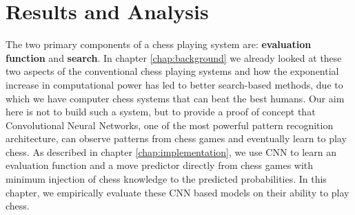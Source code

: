\chapter{Results and Analysis}
\label{chap:results}
The two primary components of a chess playing system are: \textbf{evaluation 
function} and \textbf{search}. In chapter \ref{chap:background} we already 
looked at these two aspects of the conventional chess playing systems and how 
the exponential increase in computational power has led to better search-based 
methods, due to which we have computer chess systems that can beat the best 
humans. Our aim here is not to build such a system, but to provide a proof of 
concept that Convolutional Neural Networks, one of the most powerful pattern 
recognition architecture, can observe patterns from chess games and eventually 
learn to play chess. As described in chapter \ref{chap:implementation}, we use 
CNN to learn an evaluation function and a move predictor directly from 
chess games with minimum injection of chess knowledge to the predicted 
probabilities. In this chapter, we empirically evaluate these CNN based models 
on their ability to play chess. 

